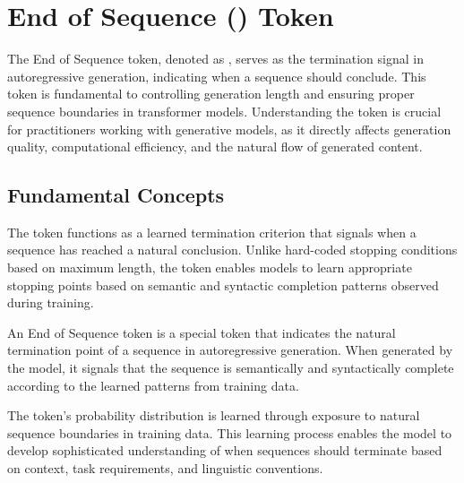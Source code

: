 
\section{End of Sequence (\eos{}) Token}

The End of Sequence token, denoted as \eos{}, serves as the termination signal in autoregressive generation, indicating when a sequence should conclude. This token is fundamental to controlling generation length and ensuring proper sequence boundaries in transformer models. Understanding the \eos{} token is crucial for practitioners working with generative models, as it directly affects generation quality, computational efficiency, and the natural flow of generated content.
\begin{comment}
Feedback: This is a clear opening. To immediately highlight its importance, you could contrast it with the alternative. For example: "Without a learned [EOS] token, models would be forced to rely on arbitrary length limits, often cutting off sentences mid-thought or rambling on nonsensically. The [EOS] token allows the model to learn the subtle art of knowing when to stop."
\end{comment}

\subsection{Fundamental Concepts}

The \eos{} token functions as a learned termination criterion that signals when a sequence has reached a natural conclusion. Unlike hard-coded stopping conditions based on maximum length, the \eos{} token enables models to learn appropriate stopping points based on semantic and syntactic completion patterns observed during training.

\begin{definition}
An End of Sequence token \eos{} is a special token that indicates the natural termination point of a sequence in autoregressive generation. When generated by the model, it signals that the sequence is semantically and syntactically complete according to the learned patterns from training data.
\end{definition}

The \eos{} token's probability distribution is learned through exposure to natural sequence boundaries in training data. This learning process enables the model to develop sophisticated understanding of when sequences should terminate based on context, task requirements, and linguistic conventions.


